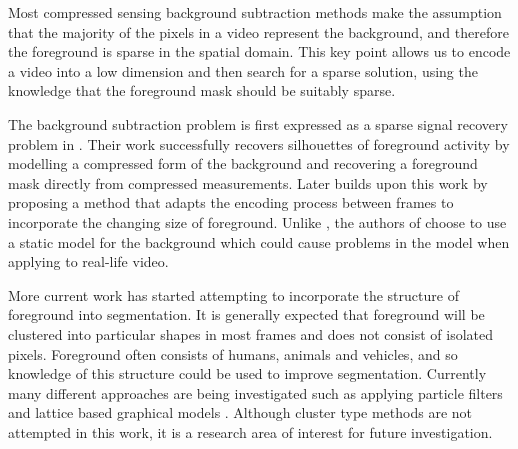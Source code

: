 Most compressed sensing background subtraction methods \cite{Cevher2008a, Cevher2008b, Warnell2011, Cossalter2009} make the assumption that the majority of the pixels in a video represent the background, and therefore the foreground is sparse in the spatial domain. This key point allows us to encode a video into a low dimension and then search for a sparse solution, using the knowledge that the foreground mask should be suitably sparse. 

The background subtraction problem is first expressed as a sparse signal recovery problem in \cite{Cevher2008b}. Their work successfully recovers silhouettes of foreground activity by modelling a compressed form of the background and recovering a foreground mask directly from compressed measurements. Later \cite{Warnell2011} builds upon this work by proposing a method that adapts the encoding process between frames to incorporate the changing size of foreground. Unlike \cite{Cevher2008b}, the authors of \cite{Warnell2011} choose to use a static model for the background which could cause problems in the model when applying to real-life video. 

More current work has started attempting to incorporate the structure of foreground into segmentation. It is generally expected that foreground will be clustered into particular shapes in most frames and does not consist of isolated pixels. Foreground often consists of humans, animals and vehicles, and so knowledge of this structure could be used to improve segmentation. Currently many different approaches are being investigated such as applying particle filters \cite{Cossalter2009} and lattice based graphical models \cite{Cevher2008a}. Although cluster type methods are not attempted in this work, it is a research area of interest for future investigation. 



